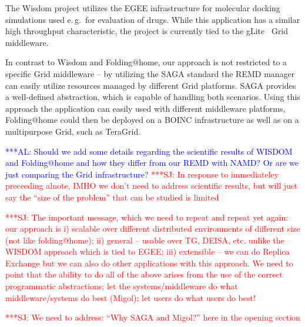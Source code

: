\documentclass[times, 10pt,twocolumn]{article}
\newcommand{\alnote}[1]{ {\textcolor{blue} { ***AL: #1 }}}
\newcommand{\jhanote}[1]{ {\textcolor{red} { ***SJ: #1 }}}
\newcommand{\alnote}[1]{}
\newcommand{\jhanote}[1]{}
\begin{document}
The Wisdom project utilizes the EGEE infrastructure for molecular
docking simulations used e.\,g.\ for evaluation of drugs. While this
application has a similar high throughput characteristic, the project
is currently tied to the gLite~\cite{glite2008} Grid middleware.

In contrast to Wisdom and Folding@home, our approach is not restricted
to a specific Grid middleware -- by utilizing the SAGA standard the
REMD manager can easily utilize resources managed by different Grid
platforms. SAGA provides a well-defined abstraction, which is capable
of handling both scenarios. Using this approach the application can
easily used with different middleware platforms, Folding@home could
then be deployed on a BOINC infrastructure as well as on a
multipurpose Grid, such as TeraGrid.

\alnote{Should we add some details regarding the scientific results of
  WISDOM and Folding@home and how they differ from our REMD with NAMD?
  Or are we just comparing the Grid infrastructure?}  \jhanote{In
  response to immediateley preceeding alnote, IMHO we don't need to
  address scientific results, but will just say the ``size of the
  problem'' that can be studied is limited}

  \jhanote{The important message, which we need to repeat and repeat
    yet again: our approach is i) scalable over different distributed
    environments of different size (not like folding@home); ii)
    general -- usable over TG, DEISA, etc. unlike the WISDOM approach
    which is tied to EGEE; iii) extensible -- we can do Replica
    Exchange but we can also do other applications with this
    approach. We need to point that the ability to do all of the above
    arises from the use of the correct programmatic abstractions; let
    the systems/middleware do what middleware/systems do best (Migol);
    let users do what users do best!}

  \jhanote{We need to address: ``Why SAGA and Migol?'' here in the
    opening section}



\end{document}
